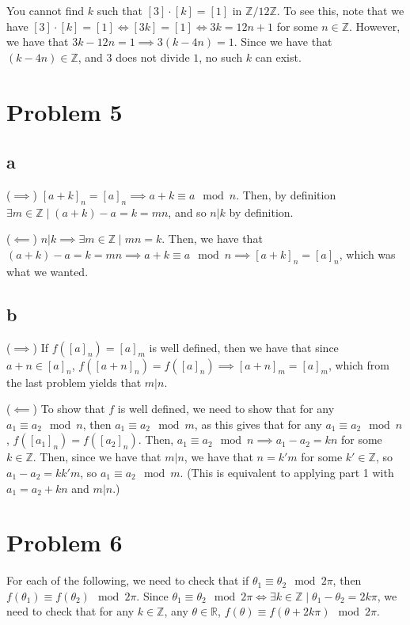 \documentclass[12pt,letterpaper]{article}
\theoremstyle{definition}
\newcommand{\R}{\mathbb{R}}
\newcommand{\Z}{\mathbb{Z}}
\begin{document}
You cannot find $k$ such that $[3] \cdot [k] = [1]$ in $\Z / 12 \Z$. To see this, note that we have $[3] \cdot [k] = [1] \iff [3k] = [1] \iff 3k = 12n + 1$ for some $n \in \Z$. However, we have that $3k - 12n = 1 \implies 3(k - 4n) = 1$. Since we have that $(k - 4n) \in \Z$, and $3$ does not divide $1$, no such $k$ can exist.

\section*{Problem 5}
\subsection*{a}

($\implies$) $[a + k]_n = [a]_n \implies a + k \equiv a \mod n$. Then, by definition $\exists m \in \Z \mid (a+k) - a= k = mn$, and so $n|k$ by definition.

($\impliedby$) $n|k \implies \exists m \in \Z \mid mn = k$. Then, we have that $(a + k) - a = k = mn \implies a + k \equiv a \mod n \implies [a + k]_n = [a]_n$, which was what we wanted.

\subsection*{b}

($\implies$) If $f([a]_n) = [a]_m$ is well defined, then we have that since $a + n \in [a]_n$, $f([a + n]_n) = f([a]_n) \implies [a + n]_m = [a]_m$, which from the last problem yields that $m | n$.

($\impliedby$) To show that $f$ is well defined, we need to show that for any $a_1 \equiv a_2 \mod n$, then $a_1 \equiv a_2 \mod m$, as this gives that for any $a_1 \equiv a_2 \mod n$, $f([a_1]_n) = f([a_2]_n)$. Then, $a_1 \equiv a_2 \mod n \implies a_1 - a_2 = kn$ for some $k \in \Z$. Then, since we have that $m | n$, we have that $n = k'm$ for some $k' \in \Z$, so $a_1 - a_2 = kk'm$, so $a_1 \equiv a_2 \mod m$. (This is equivalent to applying part 1 with $a_1 = a_2 + kn$ and $m | n$.)

\section*{Problem 6}

For each of the following, we need to check that if $\theta_1 \equiv \theta_2 \mod 2\pi$, then $f(\theta_1) \equiv f(\theta_2) \mod 2\pi$. Since $\theta_1 \equiv \theta_2\mod 2\pi \iff \exists k \in \Z \mid \theta_1 - \theta_2 = 2k\pi$, we need to check that for any $k \in \Z$, any $\theta \in \R$, $f(\theta) \equiv f(\theta + 2k\pi) \mod 2\pi$.
\end{document}
